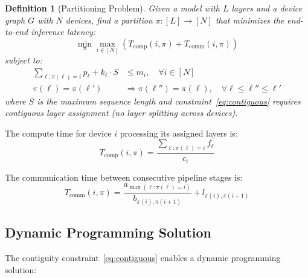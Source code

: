 \documentclass[11pt,a4paper]{article}
\newtheorem{definition}{Definition}
\begin{document}
\begin{definition}[Partitioning Problem]
Given a model with $L$ layers and a device graph $G$ with $N$ devices, find a partition $\pi: [L] \rightarrow [N]$ that minimizes the end-to-end inference latency:
\begin{equation}
    \min_\pi \max_{i \in [N]} \left( T_{\text{comp}}(i, \pi) + T_{\text{comm}}(i, \pi) \right)
\end{equation}
subject to:
\begin{align}
    \sum_{\ell : \pi(\ell) = i} p_\ell + k_\ell \cdot S &\leq m_i, \quad \forall i \in [N] \label{eq:memory} \\
    \pi(\ell) = \pi(\ell') &\Rightarrow \pi(\ell'') = \pi(\ell), \quad \forall \ell \leq \ell'' \leq \ell' \label{eq:contiguous}
\end{align}
where $S$ is the maximum sequence length and constraint~\eqref{eq:contiguous} requires contiguous layer assignment (no layer splitting across devices).
\end{definition}

The compute time for device $i$ processing its assigned layers is:
\begin{equation}
    T_{\text{comp}}(i, \pi) = \frac{\sum_{\ell : \pi(\ell) = i} f_\ell}{c_i}
\end{equation}

The communication time between consecutive pipeline stages is:
\begin{equation}
    T_{\text{comm}}(i, \pi) = \frac{a_{\max(\ell : \pi(\ell) = i)}}{b_{\pi(i), \pi(i+1)}} + l_{\pi(i), \pi(i+1)}
\end{equation}

\subsection{Dynamic Programming Solution}

The contiguity constraint~\eqref{eq:contiguous} enables a dynamic programming solution:
\end{document}
